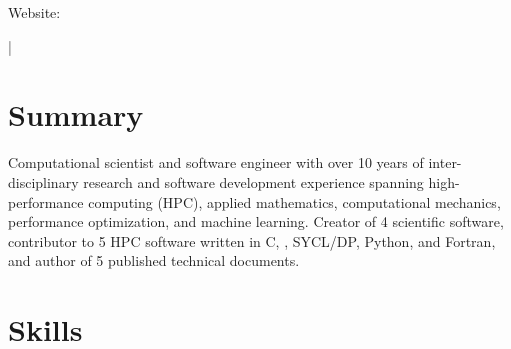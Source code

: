 \documentclass[letterpaper,10pt]{article}
\begin{document}
{\scshape\huge\Author}\vspace{2pt}

\begin{small}
  Website: \href{\AuthorWebsiteLink}{\AuthorWebsiteText}

  \vspace{2pt}\AuthorAddress

  \vspace{1pt}\href{mailto:\AuthorEmail}{\AuthorEmail} |
  \href{\AuthorPhoneLink}{\AuthorPhoneText}
\end{small}

\section{Summary}
Computational scientist and software engineer with over 10 years of
inter-disciplinary research and software development experience spanning
high-performance computing (HPC), applied mathematics, computational
mechanics, performance optimization, and machine learning. Creator of 4
scientific software, contributor to 5 HPC software written in C, \CC{},
SYCL/DP\CC{}, Python, and Fortran, and author of 5 published technical
documents.

\section{Skills}
  \resumeSubItemListStart
  \resumeSubItemListEnd

\vspace{-242.1pt}
\end{document}
